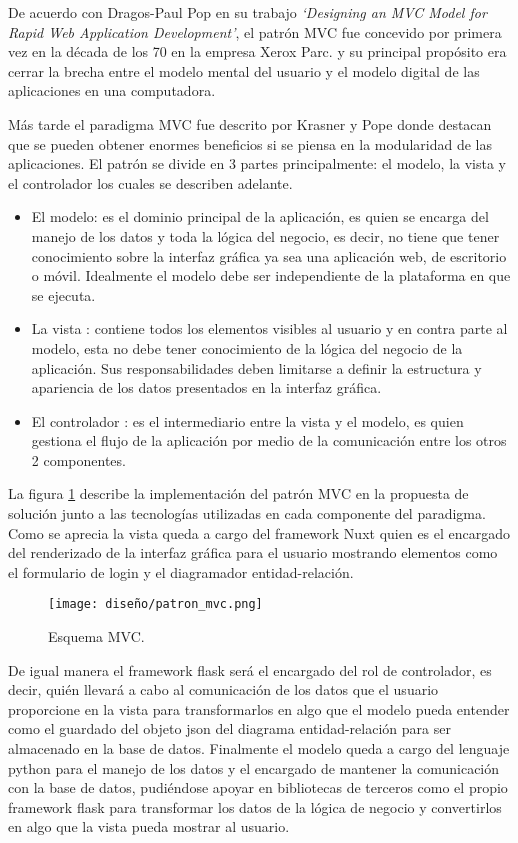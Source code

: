 De acuerdo con Dragos-Paul Pop \cite{dragos_2014} en su trabajo \textit{`Designing an MVC Model for Rapid Web Application Development'}, el patrón MVC fue concevido por primera vez en la década de los 70 en la empresa Xerox Parc. y su principal propósito era  cerrar la brecha entre el modelo mental del usuario y el modelo digital de las aplicaciones en una computadora.


Más tarde el paradigma MVC fue descrito por  Krasner y Pope\cite{pope_1988} donde destacan que se pueden obtener enormes beneficios si se piensa en la modularidad de las aplicaciones. El patrón se divide en 3 partes principalmente: el modelo, la vista y el controlador los cuales se describen adelante.

\begin{itemize}
    \item El modelo: es el dominio principal de la aplicación, es quien se encarga del manejo de los datos  y toda la lógica del negocio, es decir, no tiene que tener conocimiento sobre la interfaz gráfica ya sea una aplicación web, de escritorio o móvil. Idealmente el modelo debe ser independiente de la plataforma en que se ejecuta.
    \item La vista : contiene todos los elementos visibles al usuario y en contra parte al modelo, esta no debe tener conocimiento de la lógica del negocio de la aplicación. Sus responsabilidades deben limitarse a definir la estructura y apariencia de los datos presentados en la interfaz gráfica.
    \item El controlador : es el intermediario entre la vista y el modelo, es quien gestiona el flujo de la aplicación por medio de la comunicación entre los otros 2 componentes.
\end{itemize}

La figura \ref{img:mvc_implementation} describe la implementación del patrón MVC en la propuesta de solución junto a las tecnologías utilizadas en cada componente del paradigma. Como se aprecia la vista queda a cargo del framework Nuxt quien es el encargado del renderizado de la interfaz gráfica para el usuario mostrando elementos como el formulario de login y el diagramador entidad-relación.

\begin{figure}[H]
  \centering
  \texttt{[image: diseño/patron\_mvc.png]}
  \caption{Esquema MVC.}
  \label{img:mvc_implementation}
\end{figure}


De igual manera el framework flask será el encargado del rol de controlador, es decir, quién llevará a cabo al comunicación de los datos que el usuario proporcione en la vista para transformarlos en algo que el modelo pueda entender como el guardado del objeto json del diagrama entidad-relación para ser almacenado en la base de datos. Finalmente el modelo queda a cargo del lenguaje python para el manejo de los datos y el encargado de mantener la comunicación con la base de datos, pudiéndose apoyar en bibliotecas de terceros como el propio framework flask para transformar los datos de la lógica de negocio y convertirlos en algo que la vista pueda mostrar al usuario.
